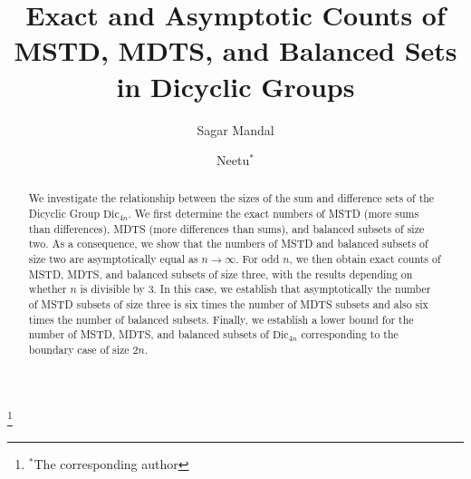 \documentclass[11pt,reqno]{amsart}
\numberwithin{equation}{section}
\begin{document}
\title[Exact and Asymptotic Counts of MSTD, MDTS, and Balanced Sets in Dicyclic Groups]{Exact and Asymptotic Counts of MSTD, MDTS, and Balanced Sets in Dicyclic Groups}


\author[Sagar Mandal]{Sagar Mandal}
\address{Department of Mathematics\\Indian Institute of Technology Ropar\\Punjab, India.}
 
\author[Neetu]{Neetu$^{*}$}
	\address{Department of Mathematical and Computational Sciences, National Institute of Technology Surathkal, Karnataka, 575025, India}
    \thanks{$^{*}$The corresponding author}
	
	
	




\begin{abstract}
We investigate the relationship between the sizes of the sum and difference sets of the Dicyclic Group $\mathrm{Dic}_{4n}$. We first determine the exact numbers of MSTD (more sums than differences), MDTS (more differences than sums), and balanced subsets of size two. As a consequence, we show that the numbers of MSTD and balanced subsets of size two are asymptotically equal as $n \to \infty$. For odd $n$, we then obtain exact counts of MSTD, MDTS, and balanced subsets of size three, with the results depending on whether $n$ is divisible by $3$. In this case, we establish that asymptotically the number of MSTD subsets of size three is six times the number of MDTS subsets and also six times the number of balanced subsets. Finally, we establish a lower bound for the number of MSTD, MDTS, and balanced subsets of $\mathrm{Dic}_{4n}$ corresponding to the boundary case of size $2n$. 
\end{abstract}
\maketitle
\tableofcontents
\end{document}
